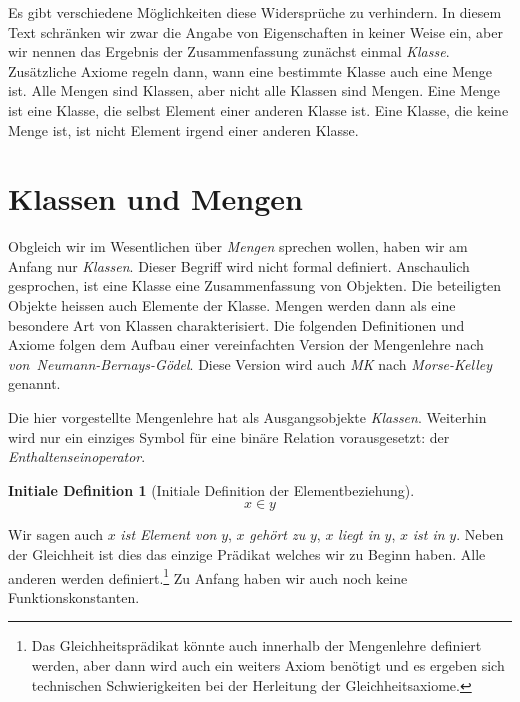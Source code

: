 \documentclass[a4paper,german,10pt,twoside]{book}
\theoremstyle{definition}
\newtheorem{idefn}[thm]{Initiale Definition}
\theoremstyle{remark}
\begin{document}
\par
Es gibt verschiedene M{\"o}glichkeiten diese Widerspr{\"u}che zu verhindern. In diesem Text schr{\"a}nken wir zwar die Angabe von Eigenschaften in keiner Weise ein, aber wir nennen das Ergebnis der Zusammenfassung zun{\"a}chst einmal \emph{Klasse}. Zus{\"a}tzliche Axiome regeln dann, wann eine bestimmte Klasse auch eine Menge ist. Alle Mengen sind Klassen, aber nicht alle Klassen sind Mengen. Eine Menge ist eine Klasse, die selbst Element einer anderen Klasse ist. Eine Klasse, die keine Menge ist, ist nicht Element irgend einer anderen Klasse.

\section{Klassen und Mengen} \label{chapter0_section0} \hypertarget{chapter0_section0}{}
Obgleich wir im Wesentlichen {\"u}ber \emph{Mengen} sprechen wollen, haben wir am Anfang nur \emph{Klassen}. Dieser Begriff wird nicht formal definiert. Anschaulich gesprochen, ist eine Klasse eine Zusammenfassung von Objekten. Die beteiligten Objekte heissen auch Elemente der Klasse.
Mengen werden dann als eine besondere Art von Klassen charakterisiert. 
Die folgenden Definitionen und Axiome folgen dem Aufbau einer vereinfachten Version der Mengenlehre nach \emph{von~Neumann-Bernays-G{\"o}del}. Diese Version wird auch \emph{MK} nach \emph{Morse-Kelley} genannt.

\par
Die hier vorgestellte Mengenlehre hat als Ausgangsobjekte \emph{Klassen}.
Weiterhin wird nur ein einziges Symbol f{\"u}r eine bin{\"a}re Relation vorausgesetzt: der \emph{Enthaltenseinoperator}.

\begin{idefn}[Initiale Definition der Elementbeziehung]
\label{in} \hypertarget{in}{}
$$x \in y$$

\end{idefn}

Wir sagen auch $x$ \emph{ist Element von} $y$, $x$ \emph{geh{\"o}rt zu} $y$, $x$ \emph{liegt in} $y$, $x$ \emph{ist in} $y$.
Neben der Gleichheit ist dies das einzige Pr{\"a}dikat welches wir zu Beginn haben. Alle anderen werden definiert.\footnote{Das Gleichheitspr{\"a}dikat k{\"o}nnte auch innerhalb der Mengenlehre definiert werden, aber dann wird auch ein weiters Axiom ben{\"o}tigt und es ergeben sich technischen Schwierigkeiten bei der Herleitung der Gleichheitsaxiome.} Zu Anfang haben wir auch noch keine Funktionskonstanten.
\end{document}
